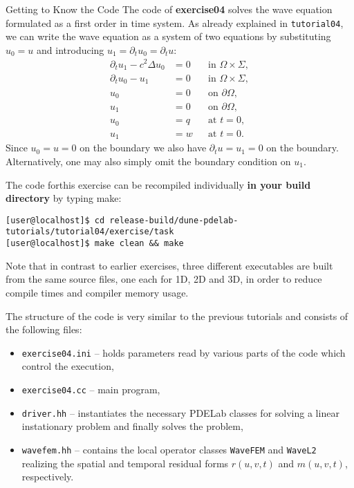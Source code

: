 \documentclass[12pt,a4paper]{article}
\begin{document}
\begin{Exercise}{Getting to Know the Code}
  \lstset{language=bash} The code of \textbf{exercise04} solves the
  wave equation formulated as a first order in time system. As already
  explained in \lstinline{tutorial04}, we can write the wave equation
  as a system of two equations by substituting $u_0=u$ and introducing
  $u_1=\partial_t u_0 =\partial_t u$:
  \begin{subequations}
    \label{eq:SystemForm1}
    \begin{align}
      \partial_t u_1 - c^2\Delta u_0 &=0 &&\text{in $\Omega\times\Sigma$}, \label{eq:2a}\\
      \partial_t u_0 - u_1 &=0 &&\text{in $\Omega\times\Sigma$}, \label{eq:2b}\\
      u_0 &= 0 &&\text{on $\partial\Omega$},\\
      u_1 &= 0 &&\text{on $\partial\Omega$},\\
      u_0 &= q &&\text{at $t=0$},\\
      u_1 &= w &&\text{at $t=0$}.
    \end{align}
  \end{subequations}
  Since $u_0=u=0$ on the boundary we also have
  $\partial_t u = u_1 = 0$ on the boundary.  Alternatively, one may
  also simply omit the boundary condition on $u_1$.


  The code forthis exercise can be recompiled individually \textbf{in
    your build directory} by typing make:
  \begin{lstlisting}
[user@localhost]$ cd release-build/dune-pdelab-tutorials/tutorial04/exercise/task
[user@localhost]$ make clean && make
  \end{lstlisting}

  Note that in contrast to earlier exercises, three different
  executables are built from the same source files, one each for 1D,
  2D and 3D, in order to reduce compile times and compiler memory
  usage.

  The structure of the code is very similar to the previous tutorials
  and consists of the following files:
  \begin{itemize}
  \item \lstinline!exercise04.ini! -- holds parameters read by various
    parts of the code which control the execution,
  \item \lstinline!exercise04.cc! -- main program,
  \item \lstinline!driver.hh! -- instantiates the necessary PDELab
    classes for solving a linear instationary problem and finally
    solves the problem,
  \item \lstinline!wavefem.hh! -- contains the local operator classes
    \lstinline!WaveFEM! and \lstinline!WaveL2! realizing the spatial
    and temporal residual forms $r(u,v,t)$ and $m(u,v,t)$,
    respectively.
  \end{itemize}


\end{Exercise}
\end{document}
